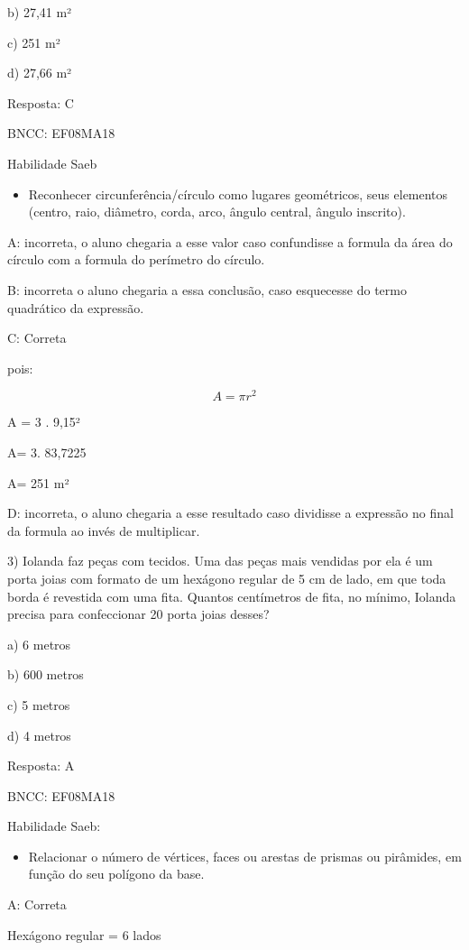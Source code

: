 b) 27,41 m²

c) 251 m²

d) 27,66 m²

Resposta: C

BNCC: EF08MA18

Habilidade Saeb

\begin{itemize}
\tightlist
\item
  Reconhecer circunferência/círculo como lugares geométricos, seus
  elementos (centro, raio, diâmetro, corda, arco, ângulo central, ângulo
  inscrito).
\end{itemize}

A: incorreta, o aluno chegaria a esse valor caso confundisse a formula
da área do círculo com a formula do perímetro do círculo.

B: incorreta o aluno chegaria a essa conclusão, caso esquecesse do termo
quadrático da expressão.

C: Correta

pois:

\[A = \pi r^{2}\]

A = 3 . 9,15²

A= 3. 83,7225

A= 251 m²

D: incorreta, o aluno chegaria a esse resultado caso dividisse a
expressão no final da formula ao invés de multiplicar.

3) Iolanda faz peças com tecidos. Uma das peças mais vendidas por ela é
um porta joias com formato de um hexágono regular de 5 cm de lado, em
que toda borda é revestida com uma fita. Quantos centímetros de fita, no
mínimo, Iolanda precisa para confeccionar 20 porta joias desses?

a) 6 metros

b) 600 metros

c) 5 metros

d) 4 metros

Resposta: A

BNCC: EF08MA18

Habilidade Saeb:

\begin{itemize}
\tightlist
\item
  Relacionar o número de vértices, faces ou arestas de prismas ou
  pirâmides, em função do seu polígono da base.
\end{itemize}

A: Correta

Hexágono regular = 6 lados

